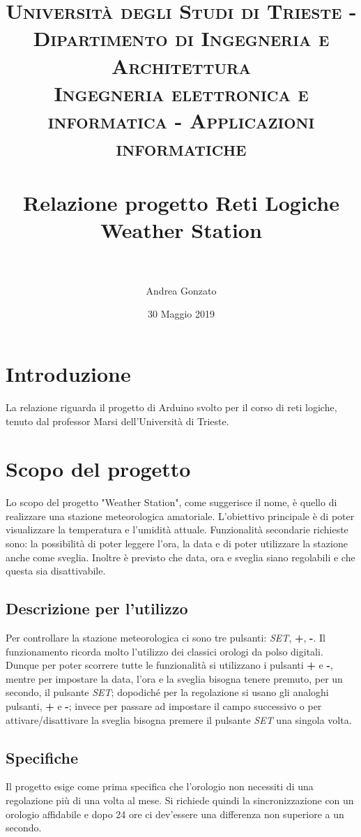 \documentclass[paper=a4, fontsize=10pt]{scrartcl}
\title{	
\normalfont \normalsize 
\textsc{Universit\`a degli Studi di Trieste - Dipartimento di Ingegneria e Architettura \\ Ingegneria elettronica e informatica - Applicazioni informatiche} \\ [25pt] %
\horrule{0.5pt} \\[0.4cm] %
\huge \textbf{Relazione progetto Reti Logiche\\ Weather Station}  \\ %
\horrule{2pt} \\[0.5cm] %
}
\author{Andrea Gonzato} %
\date{\normalsize 30 Maggio 2019} %
\begin{document}
\maketitle %

\pagebreak

\tableofcontents

\pagebreak

\section{Introduzione}
La relazione riguarda il progetto di Arduino svolto per il corso di reti logiche, tenuto dal professor Marsi dell'Università di Trieste.

\section{Scopo del progetto}
Lo scopo del progetto "Weather Station", come suggerisce il nome, è quello di realizzare una stazione meteorologica amatoriale. L'obiettivo principale è di poter visualizzare la temperatura e l'umidità attuale. Funzionalità secondarie richieste sono: la possibilità di poter leggere l'ora, la data e di poter utilizzare la stazione anche come sveglia. Inoltre è previsto che data, ora e sveglia siano regolabili e che questa sia disattivabile.

\subsection{Descrizione per l'utilizzo}
Per controllare la stazione meteorologica ci sono tre pulsanti: \textit{SET}, \textbf{+}, \textbf{-}.
Il funzionamento ricorda molto l'utilizzo dei classici orologi da polso digitali. Dunque per poter scorrere tutte le funzionalità si utilizzano i pulsanti \textbf{+} e \textbf{-}, mentre per impostare la data, l'ora e la sveglia bisogna tenere premuto, per un secondo, il pulsante \textit{SET}; dopodiché per la regolazione si usano gli analoghi pulsanti,  \textbf{+} e \textbf{-}; invece per passare ad impostare il campo successivo o per attivare/disattivare la sveglia bisogna premere il pulsante \textit{SET} una singola volta.


\subsection{Specifiche}
Il progetto esige come prima specifica che l'orologio non necessiti di una regolazione più di una volta al mese. 
Si richiede quindi la sincronizzazione con un orologio affidabile e dopo 24 ore ci dev'essere una differenza non superiore a un secondo.
\end{document}
